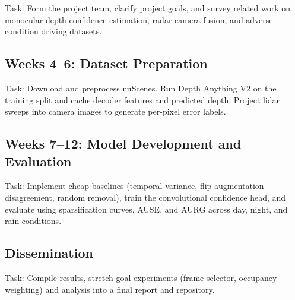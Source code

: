 \documentclass[11pt]{article}
\begin{document}
Task: Form the project team, clarify project goals, and survey related work on monocular depth confidence estimation, radar-camera fusion, and adverse-condition driving datasets.

\subsection{Weeks 4--6: Dataset Preparation}

Task: Download and preprocess nuScenes. Run Depth Anything V2 on the training split and cache decoder features and predicted depth. Project lidar sweeps into camera images to generate per-pixel error labels.

\subsection{Weeks 7--12: Model Development and Evaluation}

Task: Implement cheap baselines (temporal variance, flip-augmentation disagreement, random removal), train the convolutional confidence head, and evaluate using sparsification curves, AUSE, and AURG across day, night, and rain conditions.

\subsection{Dissemination}

Task: Compile results, stretch-goal experiments (frame selector, occupancy weighting) and analysis into a final report and repository.


\end{document}
